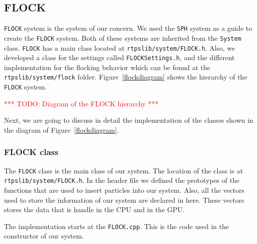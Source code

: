 \subsection{FLOCK}\label{flocksection}
\texttt{FLOCK} system is the system of our concern. We used the \texttt{SPH} system as a guide to create the \texttt{FLOCK} system. Both of these systems are inherited from the \texttt{System} class. \texttt{FLOCK} has a main class located at \texttt{rtpslib/system/FLOCK.h}. Also, we developed a class for the settings called \texttt{FLOCKSettings.h}, and the different implementation for the flocking behavior which can be found at the \texttt{rtpslib/system/flock} folder. Figure~\ref{flockdiagram} shows the hierarchy of the \texttt{FLOCK} system.

\textcolor{red}{*** TODO: Diagram of the FLOCK hierarchy ***}

Next, we are going to discuss in detail the implementation of the classes shown in the diagram of Figure~\ref{flockdiagram}.

\subsubsection{FLOCK class}
The \texttt{FLOCK} class is the main class of our system. The location of the class is at \texttt{rtpslib/system/FLOCK.h}. In the header file we defined the prototypes of the functions that are used to insert particles into our system. Also, all the vectors used to store the information of our system are declared in here. These vectors stores the data that is handle in the CPU and in the GPU.

The implementation starts at the \texttt{FLOCK.cpp}. This is the code used in the constructor of  our system.

